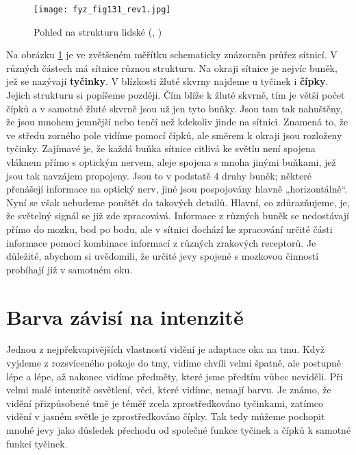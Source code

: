 {    \begin{figure}[ht!]  %
      \centering
      \texttt{[image: fyz\_fig131\_rev1.jpg]}
      \caption{Pohled na strukturu lidské \WebvisionRetina 
               (\cite[s.~468]{Feynman01}, \cite{Webvision})}
      \label{fyz:fig131}
    \end{figure}
    Na obrázku \ref{fyz:fig131} je ve zvětšeném měřítku schematicky znázorněn průřez sítnicí. V 
    různých částech má sítnice různou strukturu. Na okraji sítnice je nejvíc buněk, jež se nazývají 
    \textbf{tyčinky}. V blízkosti žluté skvrny najdeme u tyčinek i \textbf{čípky}. Jejich strukturu 
    si popíšeme později. Čím blíže k žluté skvrně, tím je větší počet čípků a v samotné žluté 
    skvrně jsou už jen tyto buňky. Jsou tam tak nahuštěny, že jsou mnohem jemnější nebo tenčí než 
    kdekoliv jinde na sítnici. Znamená to, že ve středu zorného pole vidíme pomocí čípků, ale 
    směrem k okraji jsou rozloženy tyčinky. Zajímavé je, že každá buňka sítnice citlivá ke světlu 
    není spojena vláknem přímo s optickým nervem, aleje spojena s mnoha jinými buňkami, jež jsou 
    tak navzájem propojeny. Jsou to v podstatě \(4\) druhy buněk; některé přenášejí informace na 
    optický nerv, jiné jsou pospojovány hlavně „horizontálně“. Nyní se však nebudeme pouštět do 
    takových detailů. Hlavní, co zdůrazňujeme, je, že světelný signál se již zde zpracovává. 
    Informace z různých buněk se nedostávají přímo do mozku, bod po bodu, ale v sítnici dochází ke 
    zpracování určité části informace pomocí kombinace informací z různých zrakových receptorů. Je 
    důležité, abychom si uvědomili, že určité jevy spojené s mozkovou činností probíhají již v 
    samotném oku.
    
  \section{Barva závisí na intenzitě}\label{fyz:IchapXXXVsecII}
    Jednou z nejpřekvapivějších vlastností vidění je adaptace oka na tmu. Když vyjdeme z 
    rozsvíceného pokoje do tmy, vidíme chvíli velmi špatně, ale postupně lépe a lépe, až nakonec 
    vidíme předměty, které jsme předtím vůbec neviděli. Při velmi malé intenzitě osvětlení, věci, 
    které vidíme, nemají barvu. Je známo, že vidění přizpůsobené tmě je téměř zcela zprostředkováno 
    tyčinkami, zatímco vidění v jasném světle je zprostředkováno čípky. Tak tedy můžeme pochopit 
    mnohé jevy jako důsledek přechodu od společné funkce tyčinek a čípků k samotné funkci tyčinek.
    
}
